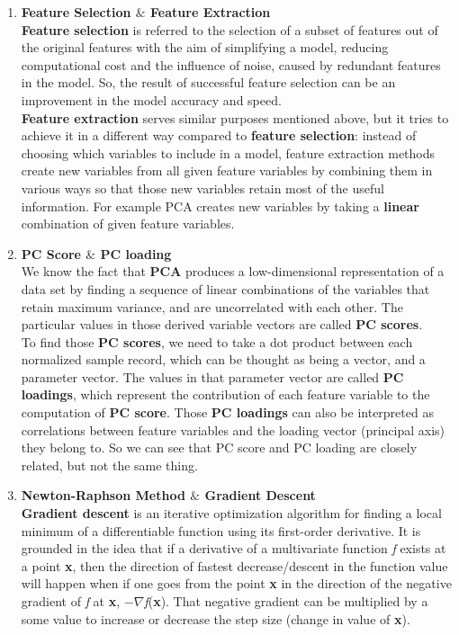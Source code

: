 \documentclass{homework}
\begin{document}
\begin{enumerate}
        \item \textbf{Feature Selection $\&$ Feature Extraction} \\
        \textbf{Feature selection} is referred to the selection of a subset of features out of the original features with the aim of simplifying a model, reducing computational cost and the influence of noise, caused by redundant features in the model. So, the result of successful feature selection can be an improvement in the model accuracy and speed. \\
        \textbf{Feature extraction} serves similar purposes mentioned above, but it tries to achieve it in a different way compared to \textbf{feature selection}: instead of choosing which variables to include in a model, feature extraction methods create new variables from all given feature variables by combining them in various ways so that those new variables retain most of the useful information. For example PCA creates new variables by taking a \textbf{linear} combination of given feature variables. 
        \item \textbf{PC Score $\&$ PC loading} \\
        We know the fact that \textbf{PCA} produces a low-dimensional representation of a data set by finding a sequence of linear combinations of the variables that retain maximum variance, and are uncorrelated with each other. The particular values in those derived variable vectors are called \textbf{PC scores}. \\
        To find those \textbf{PC scores}, we need to take a dot product between each normalized sample record, which can be thought as being a vector, and a parameter vector. The values in that parameter vector are called \textbf{PC loadings}, which represent the contribution of each feature variable to the computation of \textbf{PC score}. Those \textbf{PC loadings} can also be interpreted as correlations between feature variables and the loading vector (principal axis) they belong to. So we can see that PC score and PC loading are closely related, but not the same thing.
        \item \textbf{Newton-Raphson Method $\&$ Gradient Descent} \\
        \textbf{Gradient descent} is an iterative optimization algorithm for finding a local minimum of a differentiable function using its first-order derivative. It is grounded in the idea that if a derivative of a multivariate function \textit{f} exists at a point \textbf{x}, then the direction of fastest decrease/descent in the function value will happen when if one goes from the point \textbf{x} in the direction of the negative gradient of \textit{f} at \textbf{x},  $-\nabla$\textit{f}(\textbf{x}). That negative gradient can be multiplied by a some value to increase or decrease the step size (change in value of \textbf{x}). \\
        

\end{enumerate}
\end{document}
